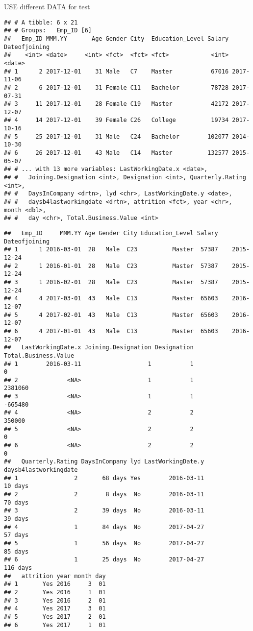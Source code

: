 \documentclass[
  ignorenonframetext,
]{beamer}
\begin{document}
\begin{frame}[fragile]{USE different DATA for test}
\protect\hypertarget{use-different-data-for-test}{}
\begin{verbatim}
## # A tibble: 6 x 21
## # Groups:   Emp_ID [6]
##   Emp_ID MMM.YY       Age Gender City  Education_Level Salary Dateofjoining
##    <int> <date>     <int> <fct>  <fct> <fct>            <int> <date>       
## 1      2 2017-12-01    31 Male   C7    Master           67016 2017-11-06   
## 2      6 2017-12-01    31 Female C11   Bachelor         78728 2017-07-31   
## 3     11 2017-12-01    28 Female C19   Master           42172 2017-12-07   
## 4     14 2017-12-01    39 Female C26   College          19734 2017-10-16   
## 5     25 2017-12-01    31 Male   C24   Bachelor        102077 2014-10-30   
## 6     26 2017-12-01    43 Male   C14   Master          132577 2015-05-07   
## # ... with 13 more variables: LastWorkingDate.x <date>,
## #   Joining.Designation <int>, Designation <int>, Quarterly.Rating <int>,
## #   DaysInCompany <drtn>, lyd <chr>, LastWorkingDate.y <date>,
## #   daysb4lastworkingdate <drtn>, attrition <fct>, year <chr>, month <dbl>,
## #   day <chr>, Total.Business.Value <int>
\end{verbatim}

\begin{verbatim}
##   Emp_ID     MMM.YY Age Gender City Education_Level Salary Dateofjoining
## 1      1 2016-03-01  28   Male  C23          Master  57387    2015-12-24
## 2      1 2016-01-01  28   Male  C23          Master  57387    2015-12-24
## 3      1 2016-02-01  28   Male  C23          Master  57387    2015-12-24
## 4      4 2017-03-01  43   Male  C13          Master  65603    2016-12-07
## 5      4 2017-02-01  43   Male  C13          Master  65603    2016-12-07
## 6      4 2017-01-01  43   Male  C13          Master  65603    2016-12-07
##   LastWorkingDate.x Joining.Designation Designation Total.Business.Value
## 1        2016-03-11                   1           1                    0
## 2              <NA>                   1           1              2381060
## 3              <NA>                   1           1              -665480
## 4              <NA>                   2           2               350000
## 5              <NA>                   2           2                    0
## 6              <NA>                   2           2                    0
##   Quarterly.Rating DaysInCompany lyd LastWorkingDate.y daysb4lastworkingdate
## 1                2       68 days Yes        2016-03-11               10 days
## 2                2        8 days  No        2016-03-11               70 days
## 3                2       39 days  No        2016-03-11               39 days
## 4                1       84 days  No        2017-04-27               57 days
## 5                1       56 days  No        2017-04-27               85 days
## 6                1       25 days  No        2017-04-27              116 days
##   attrition year month day
## 1       Yes 2016     3  01
## 2       Yes 2016     1  01
## 3       Yes 2016     2  01
## 4       Yes 2017     3  01
## 5       Yes 2017     2  01
## 6       Yes 2017     1  01
\end{verbatim}


\end{frame}
\end{document}

